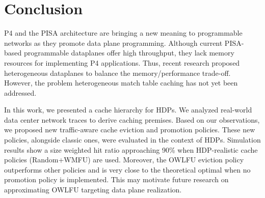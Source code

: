 \section{Conclusion}\label{sec:conclusion}

P4 and the PISA architecture are bringing a new meaning to programmable networks as they promote data plane programming.
Although current PISA-based programmable dataplanes offer high throughput, they lack memory resources for implementing P4 applications.
Thus, recent research proposed heterogeneous dataplanes to balance the memory/performance trade-off.
However, the problem heterogeneous match table caching has not yet been addressed.

In this work, we presented a cache hierarchy for HDPs.
We analyzed real-world data center network traces to derive caching premises.
Based on our observations, we proposed new traffic-aware cache eviction and promotion policies.
These new policies, alongside classic ones, were evaluated in the context of HDPs.
Simulation results show a size weighted hit ratio approaching 90\% when HDP-realistic cache policies (Random+WMFU) are used.
Moreover, the OWLFU eviction policy outperforms other policies and is very close to the theoretical optimal when no promotion policy is implemented.
This may motivate future research on approximating OWLFU targeting data plane realization.